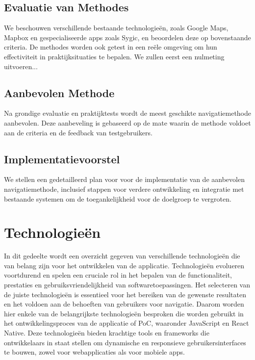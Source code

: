 \subsection{Evaluatie van Methodes}
We beschouwen verschillende bestaande technologieën, zoals Google Maps, Mapbox en gespecialiseerde apps zoals Sygic, en beoordelen deze op bovenstaande criteria. De methodes worden ook getest in een reële omgeving om hun effectiviteit in praktijksituaties te bepalen. We zullen eerst een nulmeting uitvoeren...

\subsection{Aanbevolen Methode}
Na grondige evaluatie en praktijktests wordt de meest geschikte navigatiemethode aanbevolen. Deze aanbeveling is gebaseerd op de mate waarin de methode voldoet aan de criteria en de feedback van testgebruikers.

\subsection{Implementatievoorstel}
We stellen een gedetailleerd plan voor voor de implementatie van de aanbevolen navigatiemethode, inclusief stappen voor verdere ontwikkeling en integratie met bestaande systemen om de toegankelijkheid voor de doelgroep te vergroten.

\section{Technologieën}
\label{sec:technologieën}


In dit gedeelte wordt een overzicht gegeven van verschillende technologieën die van belang zijn voor het ontwikkelen van de applicatie. Technologieën evolueren voortdurend en spelen een cruciale rol in het bepalen van de functionaliteit, prestaties en gebruiksvriendelijkheid van softwaretoepassingen. Het selecteren van de juiste technologieën is essentieel voor het bereiken van de gewenste resultaten en het voldoen aan de behoeften van gebruikers voor navigatie. Daarom worden hier enkele van de belangrijkste technologieën besproken die worden gebruikt in het ontwikkelingsproces van de applicatie of PoC, waaronder JavaScript en React Native. Deze technologieën bieden krachtige tools en frameworks die ontwikkelaars in staat stellen om dynamische en responsieve gebruikersinterfaces te bouwen, zowel voor webapplicaties als voor mobiele apps.

